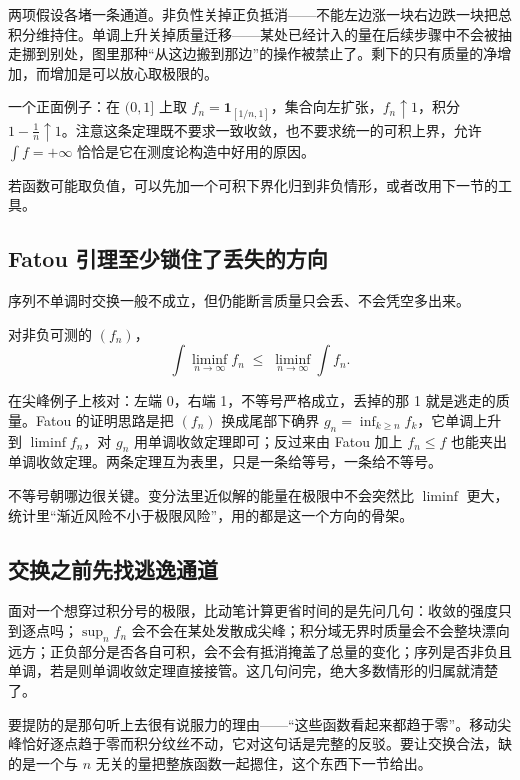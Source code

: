 两项假设各堵一条通道。非负性关掉正负抵消——不能左边涨一块右边跌一块把总积分维持住。单调上升关掉质量迁移——某处已经计入的量在后续步骤中不会被抽走挪到别处，图里那种``从这边搬到那边''的操作被禁止了。剩下的只有质量的净增加，而增加是可以放心取极限的。

一个正面例子：在 \((0,1]\) 上取 \(f_n=\mathbf1_{[1/n,1]}\)，集合向左扩张，\(f_n\uparrow1\)，积分 \(1-\frac1n\uparrow1\)。注意这条定理既不要求一致收敛，也不要求统一的可积上界，允许 \(\int f=+\infty\) 恰恰是它在测度论构造中好用的原因。

若函数可能取负值，可以先加一个可积下界化归到非负情形，或者改用下一节的工具。

\subsection{Fatou 引理至少锁住了丢失的方向}

序列不单调时交换一般不成立，但仍能断言质量只会丢、不会凭空多出来。

\begin{theorem}[Fatou 引理]
对非负可测的 \((f_n)\)，
\[
\int\liminf_{n\to\infty}f_n\;\le\;\liminf_{n\to\infty}\int f_n.
\]
\end{theorem}

在尖峰例子上核对：左端 0，右端 1，不等号严格成立，丢掉的那 1 就是逃走的质量。Fatou 的证明思路是把 \((f_n)\) 换成尾部下确界 \(g_n=\inf_{k\ge n}f_k\)，它单调上升到 \(\liminf f_n\)，对 \(g_n\) 用单调收敛定理即可；反过来由 Fatou 加上 \(f_n\le f\) 也能夹出单调收敛定理。两条定理互为表里，只是一条给等号，一条给不等号。

不等号朝哪边很关键。变分法里近似解的能量在极限中不会突然比 \(\liminf\) 更大，统计里``渐近风险不小于极限风险''，用的都是这一个方向的骨架。

\subsection{交换之前先找逃逸通道}

面对一个想穿过积分号的极限，比动笔计算更省时间的是先问几句：收敛的强度只到逐点吗；\(\sup_n f_n\) 会不会在某处发散成尖峰；积分域无界时质量会不会整块漂向远方；正负部分是否各自可积，会不会有抵消掩盖了总量的变化；序列是否非负且单调，若是则单调收敛定理直接接管。这几句问完，绝大多数情形的归属就清楚了。

要提防的是那句听上去很有说服力的理由——``这些函数看起来都趋于零''。移动尖峰恰好逐点趋于零而积分纹丝不动，它对这句话是完整的反驳。要让交换合法，缺的是一个与 \(n\) 无关的量把整族函数一起摁住，这个东西下一节给出。
